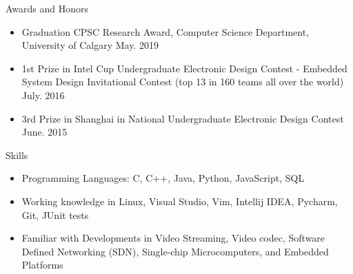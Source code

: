 \documentclass[10pt,oneside]{article}
\newenvironment{ressection}[1]{
	\vspace{4pt}
	{\fontfamily{phv}\selectfont\Large#1}
	\begin{itemize}
	\vspace{3pt}
}{
	\end{itemize}
}
\newcommand{\resitem}[1]{
	\vspace{-4pt}
	\item \begin{flushleft} #1 \end{flushleft}
}
\begin{document}
\begin{ressection}{Awards and Honors}
  \resitem{Graduation CPSC Research Award, Computer Science Department,
    University of Calgary \hfill May. 2019}
	\resitem{1st Prize in Intel Cup Undergraduate Electronic Design Contest - Embedded System Design Invitational Contest (top 13 in 160 teams all over the world) \hfill July. 2016}
	\resitem{3rd Prize in Shanghai in National Undergraduate Electronic Design Contest \hfill {June. 2015}}
\end{ressection}

\begin{ressection}{Skills}
	\resitem{Programming Languages: C, C++, Java, Python, JavaScript, SQL}
  \resitem{Working knowledge in Linux, Visual Studio, Vim, Intellij IDEA,
    Pycharm, Git, JUnit tests}
  \resitem{Familiar with Developments in Video Streaming, Video codec, Software
    Defined Networking (SDN), Single-chip Microcomputers, and Embedded
    Platforms}
\end{ressection}
\end{document}
